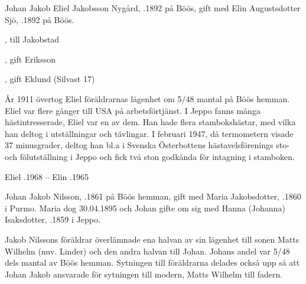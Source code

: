 Johan Jakob Eliel Jakobsson Nygård, .1892 på Böös, gift med Elin Augustsdotter Sjö, .1892 på Böös.
\begin{jhchildren}
  \item {}
  \item {}
  \item {}
  \item {}, till Jakobstad
  \item {}, gift Eriksson
  \item {}
  \item {}, gift Eklund (Silvast 17)
\end{jhchildren}
År 1911 övertog Eliel föräldrarnas lägenhet om 5/48 mantal på Böös hemman. Eliel var flere gånger till USA på arbetsförtjänst. I Jeppo fanns många hästintresserade, Eliel var en av dem. Han hade flera stambokshästar, med vilka han deltog i utställningar och tävlingar. I februari 1947, då termometern visade 37 minusgrader, deltog han bl.a i Svenska Österbottens hästavelsförenings sto- och fölutställning i Jeppo och fick två ston godkända för intagning  i stamboken.

Eliel .1968  --  Elin .1965


Johan Jakob Nilsson, .1861 på Böös hemman, gift med Maria 	Jakobsdotter, .1860 i Purmo. Maria dog 30.04.1895  och Johan gifte om sig med Hanna (Johanna) Isaksdotter, .1859 i Jeppo.
\begin{jhchildren}
  \item {}
  \item {}
  \item {}
  \item {}
  \item {}
  \item {}
  \item {}
  \item {}
\end{jhchildren}
Jakob Nilssons föräldrar överlämnade ena halvan av sin lägenhet	till sonen Matts Wilhelm (nuv. Linder) och den andra halvan till Johan.			Johans andel var 5/48 dels mantal av Böös hemman.	Sytningen till föräldrarna delades också upp så att Johan Jakob ansvarade för sytningen till modern, Matts Wilhelm till fadern.

